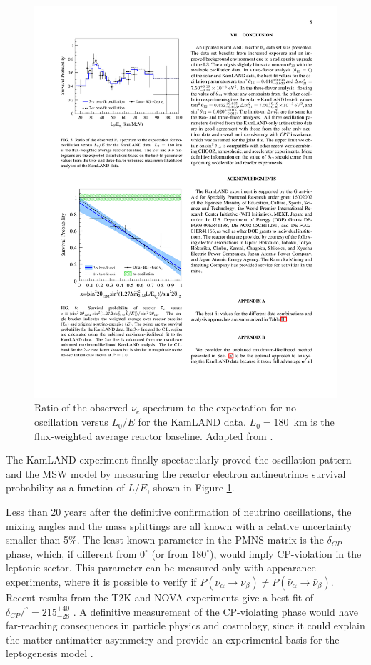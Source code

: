 \begin{figure}[htbp]
    \centering
    \includegraphics[width=0.75\linewidth]{figures/kamland.pdf}
    \caption{Ratio of the observed $\bar{\nu}_{e}$ spectrum to the expectation for no-oscillation versus $L_{0}/E$ for the KamLAND data. $L_{0} = 180$~km is the flux-weighted average reactor baseline. Adapted from \cite{Gando:2010aa}.}
    \label{fig:kamland}
\end{figure}

The KamLAND experiment finally spectacularly proved the oscillation pattern and the MSW model by measuring the reactor electron antineutrinos survival probability as a function of $L/E$, shown in Figure \ref{fig:kamland}. 

Less than 20 years after the definitive confirmation of neutrino oscillations, the mixing angles and the mass splittings are all known with a relative uncertainty smaller than 5\%. The least-known parameter in the PMNS matrix is the $\delta_{CP}$ phase, which, if different from $0^{\circ}$ (or from $180^{\circ}$), would imply CP-violation in the leptonic sector. This parameter can be measured only with appearance experiments, where it is possible to verify if
$P(\nu_{\alpha}\rightarrow\nu_{\beta}) \neq P(\bar{\nu}_{\alpha}\rightarrow\bar{\nu}_{\beta})$. Recent results from the T2K and NOVA experiments give a best fit of $\delta_{CP}/^{\circ}=215^{+40}_{-28}$ \cite{Esteban:2018azc}. A definitive measurement of the CP-violating phase would have far-reaching consequences in particle physics and cosmology, since it could explain the matter-antimatter asymmetry and provide an experimental basis for the leptogenesis model \cite{Fukugita:1986hr}.

